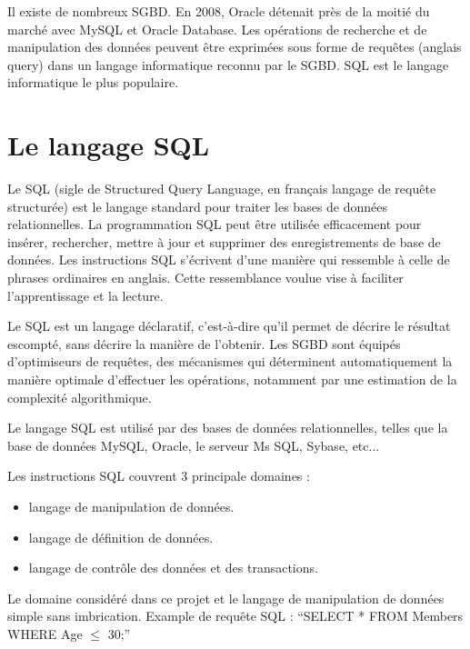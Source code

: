 \documentclass[oneside,13pt,a4paper]{report}
\begin{document}
Il existe de nombreux SGBD. En 2008, Oracle détenait près de la moitié du marché avec MySQL et Oracle Database.
Les opérations de recherche et de manipulation des données peuvent être exprimées sous forme de requêtes (anglais query)
dans un langage informatique reconnu par le SGBD. SQL est le langage informatique le plus populaire.

\section{Le langage SQL}
\label{sql}

Le SQL (sigle de Structured Query Language, en français langage de requête structurée) est le langage standard pour traiter les bases de données relationnelles.
La programmation SQL peut être utilisée efficacement pour insérer, rechercher, mettre à jour et supprimer des enregistrements de base de données.
Les instructions SQL s'écrivent d'une manière qui ressemble à celle de phrases ordinaires en anglais. Cette ressemblance voulue vise à faciliter l'apprentissage et la lecture.

Le SQL est un langage déclaratif, c'est-à-dire qu'il permet de décrire le résultat escompté, sans décrire la manière de l'obtenir.
Les SGBD sont équipés d'optimiseurs de requêtes, des mécanismes qui déterminent automatiquement la manière optimale d'effectuer les opérations,
notamment par une estimation de la complexité algorithmique.

Le langage SQL est utilisé par des bases de données relationnelles, telles que la base de données MySQL, Oracle, le serveur Ms SQL, Sybase, etc...

Les instructions SQL couvrent 3 principale domaines :
\begin{itemize}
	\item langage de manipulation de données.
	\item langage de définition de données.
	\item langage de contrôle des données et des transactions.
\end{itemize}
\vspace{0.3cm}

Le domaine considéré dans ce projet et le langage de manipulation de données simple sans imbrication.
Example de requête SQL : \enquote{SELECT * FROM Members WHERE Age $ \leq $ 30;}

\end{document}
